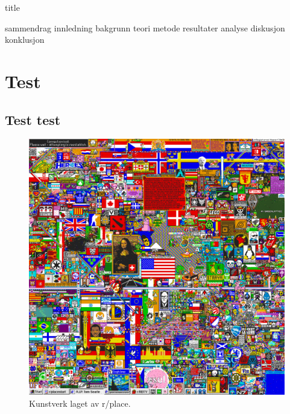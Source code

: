 



{title}
\newpage

\tableofcontents
\listoffigures
\listoftables
\lstlistoflistings
\newpage


{sammendrag}
{innledning}
{bakgrunn}
{teori}
{metode}
{resultater}
{analyse}
{diskusjon}
{konklusjon}

\section{Test}
\subsection{Test test}

\begin{figure}[h]\label{r/place}
    \centering
    \includegraphics[width=.6\textwidth]{img/r_place.png}
    \caption{Kunstverk laget av r/place.}
\end{figure}

\newpage
    
\printbibliography[heading=bibintoc]

